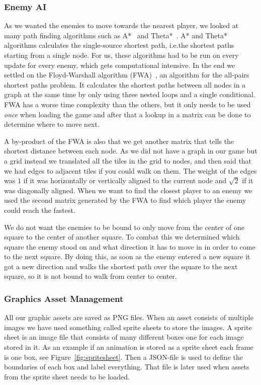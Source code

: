 \documentclass[a4paper]{article}
\begin{document}
\subsubsection{Enemy AI}\label{sec:eai}
As we wanted the enemies to move towards the nearest player, we looked at many path finding algorithms such as A*~\cite{article:astar} and Theta*~\cite{article:thetastar}. A* and Theta* algorithms calculates the single-source shortest path, i.e.\@ the shortest paths starting from a single node. For us, these algorithms had to be run on every update for every enemy, which gets computational intensive. In the end we settled on the Floyd-Warshall algorithm (FWA)~\cite{article:floydWarshall}, an algorithm for the all-pairs shortest paths problem. It calculates the shortest paths between all nodes in a graph at the same time by only using three nested loops and a single conditional. FWA has a worse time complexity than the others, but it only needs to be used \emph{once} when loading the game and after that a lookup in a matrix can be done to determine where to move next.

A by-product of the FWA is also that we get another matrix that tells the shortest distance between each node. As we did not have a graph in our game but a grid instead we translated all the tiles in the grid to nodes, and then said that we had edges to adjacent tiles if you could walk on them. The weight of the edges was $1$ if it was horizontally or vertically aligned to the current node and $\sqrt{2}$ if it was diagonally aligned. When we want to find the closest player to an enemy we used the second matrix generated by the FWA to find which player the enemy could reach the fastest.

We do not want the enemies to be bound to only move from the center of one square to the center of another square. To combat this we determined which square the enemy stood on and what direction it has to move in in order to come to the next square. By doing this, as soon as the enemy entered a new square it got a new direction and walks the shortest path over the square to the next square, so it is not bound to walk from center to center.

\subsubsection{Graphics Asset Management}\label{sec:gam}
All our graphic assets are saved as PNG files. When an asset consists of multiple images we have used something called sprite sheets to store the images. A sprite sheet is an image file that consists of many different boxes one for each image stored in it. As an example if an animation is stored as a sprite sheet each frame is one box, see Figure~\ref{fig:spritesheet}. Then a JSON-file is used to define the boundaries of each box and label everything. That file is later used when assets from the sprite sheet needs to be loaded.
\end{document}
